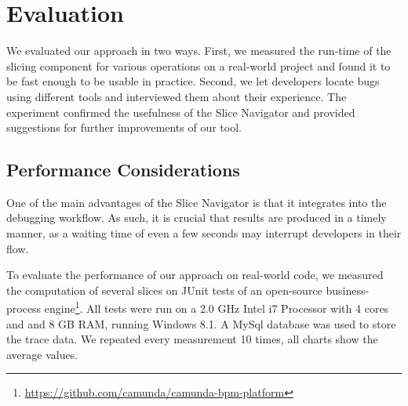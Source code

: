 


\tmpEnd

\section{Evaluation}
\label{sec:eval}

\tmpStart
We evaluated our approach in two ways.
First, we measured the run-time of the slicing component for various operations on a real-world project and found it to be fast enough to be usable in practice.
Second, we let developers locate bugs using different tools and interviewed them about their experience.
The experiment confirmed the usefulness of the Slice Navigator and provided suggestions for further improvements of our tool.
%
%
\subsection{Performance Considerations}

One of the main advantages of the Slice Navigator is that it integrates into the debugging workflow.
As such, it is crucial that results are produced in a timely manner, as a waiting time of even a few seconds may interrupt developers in their flow.

To evaluate the performance of our approach on real-world code, we measured the computation of several slices on JUnit tests of an open-source business-process engine\footnote{\url{https://github.com/camunda/camunda-bpm-platform}}.
All tests were run on a 2.0 GHz Intel i7 Processor with 4 cores and and 8 GB RAM, running Windows 8.1.
A MySql database was used to store the trace data.
We repeated every measurement 10 times, all charts show the average values.

